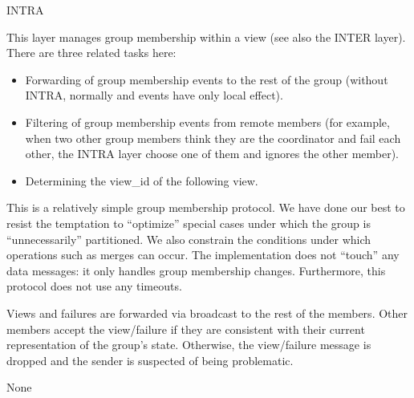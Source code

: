 %
%
%
\begin{Layer}{INTRA}

This layer manages group membership within a view (see also the INTER layer).
There are three related tasks here:
\begin{itemize}
\item
Forwarding of group membership events to the rest of the group
(without INTRA, normally  and  events have only local
effect).
\item 
Filtering of group membership events from remote members (for
example, when two other group members think they are the coordinator
and fail each other, the INTRA layer choose one of them and ignores
the other member).
\item
Determining the view\_id of the following view.
\end{itemize}

\begin{Protocol}
This is a relatively simple group membership protocol.  We have done our
best to resist the temptation to ``optimize'' special cases under which the
group is ``unnecessarily'' partitioned.  We also constrain the conditions
under which operations such as merges can occur.  The implementation does
not ``touch'' any data messages: it only handles group membership changes.
Furthermore, this protocol does not use any timeouts.

Views and failures are forwarded via broadcast to the rest of the members.
Other members accept the view/failure if they are consistent with their
current representation of the group's state.  Otherwise, the view/failure
message is dropped and the sender is suspected of being problematic. 
\end{Protocol}

\begin{Parameters}
\item None
\end{Parameters}


\end{Layer}
